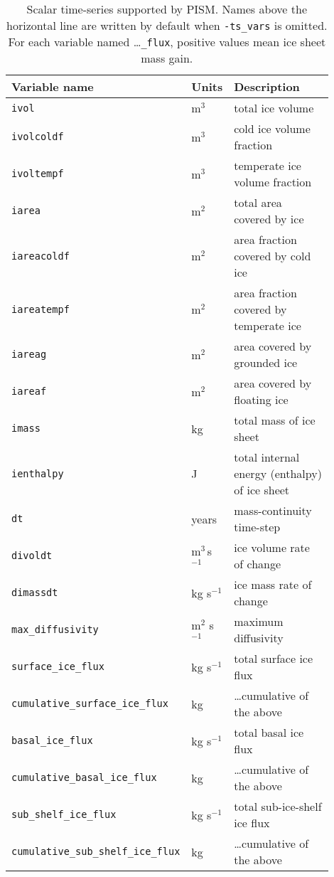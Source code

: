 \begin{table}[ht]
  \centering
  \caption{Scalar time-series supported by PISM.  Names above the horizontal line are written by default when \texttt{-ts_vars} is omitted.  For each variable named \dots\texttt{_flux}, positive values mean ice sheet mass gain.}
  \begin{tabular}{p{0.4\linewidth}p{0.1\linewidth}p{0.4\linewidth}}
    \toprule
    \textbf{Variable name} & \textbf{Units} & \textbf{Description}\\
    \midrule
    \texttt{ivol} &m$^{3}$ & total ice volume\\
    \texttt{ivolcoldf} &m$^{3}$ & cold ice volume fraction\\
    \texttt{ivoltempf} &m$^{3}$ & temperate ice volume fraction\\
    \texttt{iarea} & m$^{2}$ & total area covered by ice \\
    \texttt{iareacoldf} & m$^{2}$ & area fraction covered by cold ice \\
    \texttt{iareatempf} & m$^{2}$ & area fraction covered by temperate ice \\
    \texttt{iareag} & m$^{2}$ & area covered by grounded ice\\
    \texttt{iareaf} & m$^{2}$ & area covered by floating ice\\
    \texttt{imass} & kg & total mass of ice sheet \\
    \texttt{ienthalpy} & J & total internal energy (enthalpy) of ice sheet \\
    \texttt{dt} & years & mass-continuity time-step\\ 
    \texttt{divoldt} & m$^{3}\,$s$^{-1}$ & ice volume rate of change\\
    \texttt{dimassdt} & kg s$^{-1}$ & ice mass rate of change\\
    \texttt{max_diffusivity} & m$^{2}$ s$^{-1}$ & maximum diffusivity \\
    \texttt{surface_ice_flux} & kg s$^{-1}$ & total surface ice flux \\
    \texttt{cumulative_surface_ice_flux} & kg & \ldots cumulative of the above \\
    \texttt{basal_ice_flux} & kg s$^{-1}$ & total basal ice flux \\
    \texttt{cumulative_basal_ice_flux} & kg & \ldots cumulative of the above \\
    \texttt{sub_shelf_ice_flux} & kg s$^{-1}$  & total sub-ice-shelf ice flux \\
    \texttt{cumulative_sub_shelf_ice_flux} & kg  & \ldots cumulative of the above \\

\end{tabular}
\end{table}
